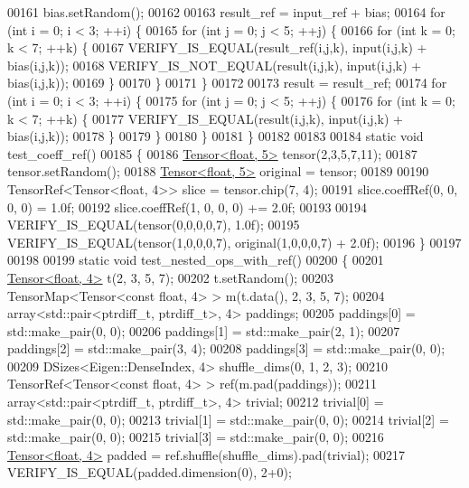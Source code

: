 \begin{DoxyCode}
00161   bias.setRandom();
00162 
00163   result\_ref = input\_ref + bias;
00164   \textcolor{keywordflow}{for} (\textcolor{keywordtype}{int} i = 0; i < 3; ++i) \{
00165     \textcolor{keywordflow}{for} (\textcolor{keywordtype}{int} j = 0; j < 5; ++j) \{
00166       \textcolor{keywordflow}{for} (\textcolor{keywordtype}{int} k = 0; k < 7; ++k) \{
00167         VERIFY\_IS\_EQUAL(result\_ref(i,j,k), input(i,j,k) + bias(i,j,k));
00168         VERIFY\_IS\_NOT\_EQUAL(result(i,j,k), input(i,j,k) + bias(i,j,k));
00169       \}
00170     \}
00171   \}
00172 
00173   result = result\_ref;
00174   \textcolor{keywordflow}{for} (\textcolor{keywordtype}{int} i = 0; i < 3; ++i) \{
00175     \textcolor{keywordflow}{for} (\textcolor{keywordtype}{int} j = 0; j < 5; ++j) \{
00176       \textcolor{keywordflow}{for} (\textcolor{keywordtype}{int} k = 0; k < 7; ++k) \{
00177         VERIFY\_IS\_EQUAL(result(i,j,k), input(i,j,k) + bias(i,j,k));
00178       \}
00179     \}
00180   \}
00181 \}
00182 
00183 
00184 \textcolor{keyword}{static} \textcolor{keywordtype}{void} test\_coeff\_ref()
00185 \{
00186   \hyperlink{class_eigen_1_1_tensor}{Tensor<float, 5>} tensor(2,3,5,7,11);
00187   tensor.setRandom();
00188   \hyperlink{class_eigen_1_1_tensor}{Tensor<float, 5>} original = tensor;
00189 
00190   TensorRef<Tensor<float, 4>> slice = tensor.chip(7, 4);
00191   slice.coeffRef(0, 0, 0, 0) = 1.0f;
00192   slice.coeffRef(1, 0, 0, 0) += 2.0f;
00193 
00194   VERIFY\_IS\_EQUAL(tensor(0,0,0,0,7), 1.0f);
00195   VERIFY\_IS\_EQUAL(tensor(1,0,0,0,7), original(1,0,0,0,7) + 2.0f);
00196 \}
00197 
00198 
00199 \textcolor{keyword}{static} \textcolor{keywordtype}{void} test\_nested\_ops\_with\_ref()
00200 \{
00201   \hyperlink{class_eigen_1_1_tensor}{Tensor<float, 4>} t(2, 3, 5, 7);
00202   t.setRandom();
00203   TensorMap<Tensor<const float, 4> > m(t.data(), 2, 3, 5, 7);
00204   array<std::pair<ptrdiff\_t, ptrdiff\_t>, 4> paddings;
00205   paddings[0] = std::make\_pair(0, 0);
00206   paddings[1] = std::make\_pair(2, 1);
00207   paddings[2] = std::make\_pair(3, 4);
00208   paddings[3] = std::make\_pair(0, 0);
00209   DSizes<Eigen::DenseIndex, 4> shuffle\_dims(0, 1, 2, 3);
00210   TensorRef<Tensor<const float, 4> > ref(m.pad(paddings));
00211   array<std::pair<ptrdiff\_t, ptrdiff\_t>, 4> trivial;
00212   trivial[0] = std::make\_pair(0, 0);
00213   trivial[1] = std::make\_pair(0, 0);
00214   trivial[2] = std::make\_pair(0, 0);
00215   trivial[3] = std::make\_pair(0, 0);
00216   \hyperlink{class_eigen_1_1_tensor}{Tensor<float, 4>} padded = ref.shuffle(shuffle\_dims).pad(trivial);
00217   VERIFY\_IS\_EQUAL(padded.dimension(0), 2+0);

\end{DoxyCode}
